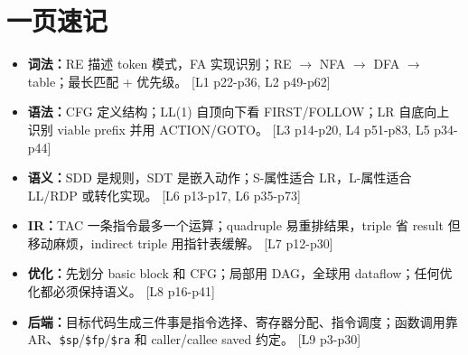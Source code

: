 \documentclass[UTF8,fontset=none,11pt]{ctexart}
\newcommand{\pg}[1]{{\scriptsize\textcolor{citegray}{[#1]}}}
\newcommand{\code}[1]{\texttt{#1}}
\begin{document}
\section{一页速记}

\begin{itemize}
  \item \textbf{词法：}RE 描述 token 模式，FA 实现识别；RE \(\to\) NFA \(\to\) DFA \(\to\) table；最长匹配 + 优先级。 \pg{L1 p22-p36, L2 p49-p62}
  \item \textbf{语法：}CFG 定义结构；LL(1) 自顶向下看 FIRST/FOLLOW；LR 自底向上识别 viable prefix 并用 ACTION/GOTO。 \pg{L3 p14-p20, L4 p51-p83, L5 p34-p44}
  \item \textbf{语义：}SDD 是规则，SDT 是嵌入动作；S-属性适合 LR，L-属性适合 LL/RDP 或转化实现。 \pg{L6 p13-p17, L6 p35-p73}
  \item \textbf{IR：}TAC 一条指令最多一个运算；quadruple 易重排结果，triple 省 result 但移动麻烦，indirect triple 用指针表缓解。 \pg{L7 p12-p30}
  \item \textbf{优化：}先划分 basic block 和 CFG；局部用 DAG，全球用 dataflow；任何优化都必须保持语义。 \pg{L8 p16-p41}
  \item \textbf{后端：}目标代码生成三件事是指令选择、寄存器分配、指令调度；函数调用靠 AR、\code{\$sp}/\code{\$fp}/\code{\$ra} 和 caller/callee saved 约定。 \pg{L9 p3-p30}
\end{itemize}
\end{document}
